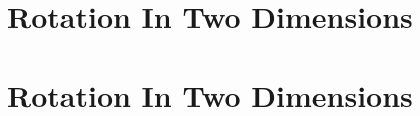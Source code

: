 \newcommand{\atan}{a^{\text{TAN}}}
\newcommand{\Ftan}{F^{\text{TAN}}}
\newcommand{\vtan}{v^{\text{TAN}}}
\newcommand{\arad}{a^{\text{RAD}}}
\newcommand{\Frad}{F^{\text{RAD}}}
\newcommand{\vrad}{v^{\text{RAD}}}

\def\chapterbody{
  \section{Rotation In Two Dimensions}

  
  
  
  
  
}

\ifx\bookmode\undefined
  

  \setcounter{section}{17}

  
    \chapterbody
  
\else
  \chapterbody
\fi
